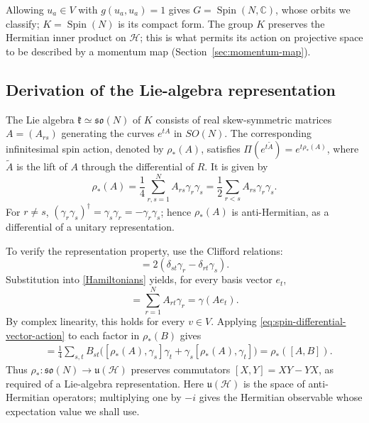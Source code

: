 \documentclass{article}
\theoremstyle{definition}
\theoremstyle{remark}
\newcommand{\C}{\mathbb C}
\newcommand{\Spin}{\operatorname{Spin}}
\begin{document}
Allowing $u_a\in V$ with $g(u_a,u_a)=1$ gives $G=\Spin(N,\C)$, whose orbits
we classify; $K=\Spin(N)$ is its compact form. The group $K$
preserves the Hermitian inner product on $\mathcal H$; this is what permits
its action on projective space to be described by a momentum map
(Section~\ref{sec:momentum-map}).

\subsection{Derivation of the Lie-algebra representation}
\label{sec:spin-lie-algebra-derivation}

The Lie algebra $\mathfrak k\simeq\mathfrak{so}(N)$ of $K$ consists of real skew-symmetric
matrices $A=(A_{rs})$ generating the curves $e^{tA}$ in $SO(N)$. The
corresponding infinitesimal spin action, denoted by $\rho_*(A)$, satisfies
$\Pi(e^{t\widetilde A})=e^{t\rho_*(A)}$, where $\widetilde A$ is the lift of
$A$ through the differential of $R$. It is given by
\begin{equation}
 \rho_*(A)=\frac14\sum_{r,s=1}^N A_{rs}\gamma_r\gamma_s
 =\frac12\sum_{r<s}A_{rs}\gamma_r\gamma_s .
 \label{Hamiltonians}
\end{equation}
For $r\ne s$,
$(\gamma_r\gamma_s)^\dagger
=\gamma_s\gamma_r=-\gamma_r\gamma_s$; hence
$\rho_*(A)$ is anti-Hermitian, as a differential of a unitary
representation.

To verify the representation property, use the Clifford relations:
\begin{equation}
 [\gamma_r\gamma_s,\gamma_t]
 =2(\delta_{st}\gamma_r-\delta_{rt}\gamma_s).
\end{equation}
Substitution into \eqref{Hamiltonians} yields, for every basis vector
$e_t$,
\begin{equation}
 [\rho_*(A),\gamma_t]
 =\sum_{r=1}^NA_{rt}\gamma_r
 =\gamma(Ae_t).
 \label{eq:spin-differential-vector-action}
\end{equation}
By complex linearity, this holds for every $v\in V$.  Applying
\eqref{eq:spin-differential-vector-action} to each factor in
$\rho_*(B)$ gives
\begin{align}
 [\rho_*(A),\rho_*(B)]
 &=\frac14\sum_{s,t}B_{st}
 \bigl([\rho_*(A),\gamma_s]\gamma_t
       +\gamma_s[\rho_*(A),\gamma_t]\bigr)
 =\rho_*([A,B]).
\end{align}
Thus $\rho_*:\mathfrak{so}(N)\to\mathfrak u(\mathcal H)$
preserves commutators $[X,Y]=XY-YX$, as required of a Lie-algebra
representation. Here $\mathfrak u(\mathcal H)$ is the space of
anti-Hermitian operators; multiplying one by $-i$ gives the Hermitian
observable whose expectation value we shall use.
\end{document}
